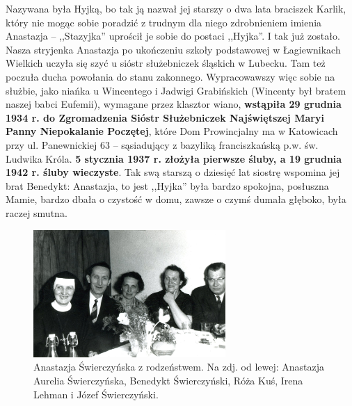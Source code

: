 Nazywana była Hyjką, bo tak ją nazwał jej starszy o dwa lata braciszek Karlik, który nie mogąc sobie poradzić z trudnym dla niego zdrobnieniem imienia Anastazja – ,,Stazyjka'' uprościł je sobie do postaci ,,Hyjka''. I tak już zostało. Nasza stryjenka Anastazja po ukończeniu szkoły podstawowej w Łagiewnikach Wielkich uczyła się szyć u sióstr służebniczek śląskich w Lubecku. Tam też poczuła ducha powołania do stanu zakonnego. Wypracowawszy więc sobie na służbie, jako niańka u Wincentego i Jadwigi Grabińskich (Wincenty był bratem naszej babci Eufemii), wymagane przez klasztor wiano, \textbf{wstąpiła 29 grudnia 1934 r. do Zgromadzenia Sióstr Służebniczek Najświętszej Maryi Panny Niepokalanie Poczętej}, które Dom Prowincjalny ma w Katowicach przy ul. Panewnickiej 63 – sąsiadujący z bazyliką franciszkańską p.w. św. Ludwika Króla. \textbf{5 stycznia 1937 r. złożyła pierwsze śluby, a 19 grudnia 1942 r. śluby wieczyste}. Tak swą starszą o dziesięć lat siostrę wspomina jej brat Benedykt: Anastazja, to jest ,,Hyjka'' była bardzo spokojna, posłuszna Mamie, bardzo dbała o czystość w domu, zawsze o czymś dumała głęboko, była raczej smutna.
\begin{figure}[!h]
\begin{center}
\includegraphics[width=0.65\textwidth]{photo/anastazja_swierczynska_2.jpg}
\caption[Anastazja Świerczyńska z rodzeństwem]{Anastazja Świerczyńska z rodzeństwem. Na zdj. od lewej: Anastazja Aurelia Świerczyńska, Benedykt Świerczyński, Róża Kuś, Irena Lehman i Józef Świerczyński.}
\label{rys:anastazja_swierczynska_2}
\end{center}
\end{figure}
